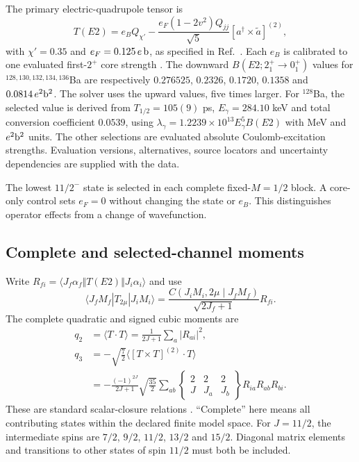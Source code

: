 \documentclass[pdflatex,iicol,sn-mathphys-num]{sn-jnl}
\begin{document}
The primary electric-quadrupole tensor is
\begin{equation}
T(E2)=e_BQ_{\chi'}-\frac{e_F(1-2v^2)Q_{jj}}{\sqrt5}
[a^\dagger\times\widetilde a]^{(2)},\label{eq:e2}
\end{equation}
with $\chi'=0.35$ and $e_F=0.125\,e\,{\rm b}$, as specified in Ref.~\cite{Nomura2017}. Each $e_B$ is calibrated to one evaluated first-$2^+$ core strength \cite{ENSDF}. The downward $B(E2;2_1^+\to0_1^+)$ values for $^{128,130,132,134,136}$Ba are respectively $0.276525$, $0.2326$, $0.1720$, $0.1358$ and $0.0814\,e^2{\rm b}^2$. The solver uses the upward values, five times larger. For $^{128}$Ba, the selected value is derived from $T_{1/2}=105(9)$ ps, $E_\gamma=284.10$ keV and total conversion coefficient $0.0539$, using
$\lambda_\gamma=1.2239\times10^{13}E_\gamma^5B(E2)$ with MeV and $e^2{\rm b}^2$ units. The other selections are evaluated absolute Coulomb-excitation strengths. Evaluation versions, alternatives, source locators and uncertainty dependencies are supplied with the data.

The lowest $11/2^-$ state is selected in each complete fixed-$M=1/2$ block. A core-only control sets $e_F=0$ without changing the state or $e_B$. This distinguishes operator effects from a change of wavefunction.

\subsection{Complete and selected-channel moments}

Write $R_{fi}=\langle J_f\alpha_f\Vert T(E2)\Vert J_i\alpha_i\rangle$ and use
\begin{equation}
\langle J_fM_f|T_{2\mu}|J_iM_i\rangle
=\frac{C(J_iM_i,2\mu\mid J_fM_f)}{\sqrt{2J_f+1}}R_{fi}.
\end{equation}
The complete quadratic and signed cubic moments are
\begin{align}
q_2&=\langle T\cdot T\rangle
=\frac{1}{2J+1}\sum_a|R_{ai}|^2,\label{eq:q2}\\
q_3&=-\sqrt{\frac72}\langle[T\times T]^{(2)}\cdot T\rangle\nonumber\\
&=-\frac{(-1)^{2J}}{2J+1}\sqrt{\frac{35}{2}}
\sum_{ab}\begin{Bmatrix}2&2&2\\J&J_a&J_b\end{Bmatrix}
R_{ia}R_{ab}R_{bi}.\label{eq:q3}
\end{align}
These are standard scalar-closure relations \cite{Cline1986,Henderson2020,Bally2022}. ``Complete'' here means all contributing states within the declared finite model space. For $J=11/2$, the intermediate spins are $7/2$, $9/2$, $11/2$, $13/2$ and $15/2$. Diagonal matrix elements and transitions to other states of spin $11/2$ must both be included.
\end{document}
